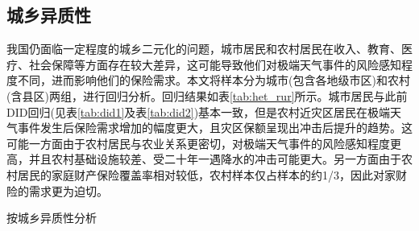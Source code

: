 \subsection{城乡异质性}
我国仍面临一定程度的城乡二元化的问题，城市居民和农村居民在收入、教育、医疗、社会保障等方面存在较大差异，这可能导致他们对极端天气事件的风险感知程度不同，进而影响他们的保险需求。本文将样本分为城市(包含各地级市区)和农村(含县区)两组，进行回归分析。回归结果如表\ref{tab:het_rur}所示。城市居民与此前DID回归(见表\ref{tab:did1}及表\ref{tab:did2})基本一致，但是农村近灾区居民在极端天气事件发生后保险需求增加的幅度更大，且灾区保额呈现出冲击后提升的趋势。这可能一方面由于农村居民与农业关系更密切，对极端天气事件的风险感知程度更高，并且农村基础设施较差、受二十年一遇降水的冲击可能更大。另一方面由于农村居民的家庭财产保险覆盖率相对较低，农村样本仅占样本的约1/3，因此对家财险的需求更为迫切。

\begin{table}[htbp]
    \centering
    \caption{按城乡异质性分析}\label{tab:het_rur}
    
\end{table}
